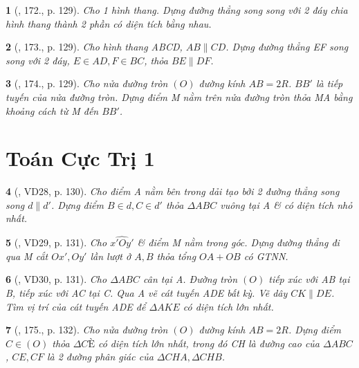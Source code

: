\documentclass{article}
\newtheorem{baitoan}{}
\begin{document}
\begin{baitoan}[\cite{Binh_Toan_9_tap_1}, 172., p. 129]
	Cho 1 hình thang. Dựng đường thẳng song song với 2 đáy chia hình thang thành 2 phần có diện tích bằng nhau.
\end{baitoan}

\begin{baitoan}[\cite{Binh_Toan_9_tap_1}, 173., p. 129]
	Cho hình thang ABCD, $AB\parallel CD$. Dựng đường thẳng EF song song với 2 đáy, $E\in AD,F\in BC$, thỏa $BE\parallel DF$.
\end{baitoan}

\begin{baitoan}[\cite{Binh_Toan_9_tap_1}, 174., p. 129]
	Cho nửa đường tròn $(O)$ đường kính $AB = 2R$. $BB'$ là tiếp tuyến của nửa đường tròn. Dựng điểm M nằm trên nửa đường tròn thỏa MA bằng khoảng cách từ M đến $BB'$.
\end{baitoan}


\section{Toán Cực Trị 1}

\begin{baitoan}[\cite{Binh_Toan_9_tap_1}, VD28, p. 130]
	Cho điểm A nằm bên trong dải tạo bởi 2 đường thẳng song song $d\parallel d'$. Dựng điểm $B\in d,C\in d'$ thỏa $\Delta ABC$ vuông tại A \& có diện tích nhỏ nhất.
\end{baitoan}

\begin{baitoan}[\cite{Binh_Toan_9_tap_1}, VD29, p. 131]
	Cho $\widehat{x'Oy'}$ \& điểm M nằm trong góc. Dựng đường thẳng đi qua M cắt $Ox',Oy'$ lần lượt ở $A,B$ thỏa tổng $OA + OB$ có {\rm GTNN}.
\end{baitoan}

\begin{baitoan}[\cite{Binh_Toan_9_tap_1}, VD30, p. 131]
	Cho $\Delta ABC$ cân tại A. Đường tròn $(O)$ tiếp xúc với AB tại B, tiếp xúc với AC tại C. Qua A vẽ cát tuyến ADE bất kỳ. Vẽ dây $CK\parallel DE$. Tìm vị trí của cát tuyến ADE để $\Delta AKE$ có diện tích lớn nhất.
\end{baitoan}

\begin{baitoan}[\cite{Binh_Toan_9_tap_1}, 175., p. 132]
	Cho nửa đường tròn $(O)$ đường kính $AB = 2R$. Dựng điểm $C\in(O)$ thỏa $\Delta CÈ$ có diện tích lớn nhất, trong đó CH là đường cao của $\Delta ABC$, $CE,CF$ là 2 đường phân giác của $\Delta CHA,\Delta CHB$.
\end{baitoan}
\end{document}

